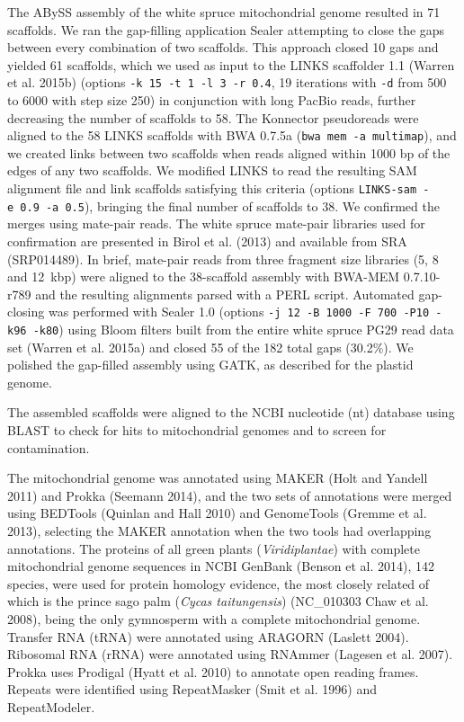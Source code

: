 \documentclass[
  12pt,
  oneside,
  openany]{book}
\begin{document}
The ABySS assembly of the white spruce mitochondrial genome resulted in 71 scaffolds. We ran the gap-filling application Sealer attempting to close the gaps between every combination of two scaffolds. This approach closed 10 gaps and yielded 61 scaffolds, which we used as input to the LINKS scaffolder 1.1 (Warren et al. 2015b) (options \texttt{-k\ 15\ -t\ 1\ -l\ 3\ -r\ 0.4}, 19 iterations with \texttt{-d} from 500 to 6000 with step size 250) in conjunction with long PacBio reads, further decreasing the number of scaffolds to 58. The Konnector pseudoreads were aligned to the 58 LINKS scaffolds with BWA 0.7.5a (\texttt{bwa\ mem\ -a\ multimap}), and we created links between two scaffolds when reads aligned within 1000 bp of the edges of any two scaffolds. We modified LINKS to read the resulting SAM alignment file and link scaffolds satisfying this criteria (options \texttt{LINKS-sam\ -e\ 0.9\ -a\ 0.5}), bringing the final number of scaffolds to 38. We confirmed the merges using mate-pair reads. The white spruce mate-pair libraries used for confirmation are presented in Birol et al. (2013) and available from SRA (SRP014489). In brief, mate-pair reads from three fragment size libraries (5, 8 and 12~kbp) were aligned to the 38-scaffold assembly with BWA-MEM 0.7.10-r789 and the resulting alignments parsed with a PERL script. Automated gap-closing was performed with Sealer 1.0 (options \texttt{-j\ 12\ -B\ 1000\ -F\ 700\ -P10\ -k96\ -k80}) using Bloom filters built from the entire white spruce PG29 read data set (Warren et al. 2015a) and closed 55 of the 182 total gaps (30.2\%). We polished the gap-filled assembly using GATK, as described for the plastid genome.

The assembled scaffolds were aligned to the NCBI nucleotide (nt) database using BLAST to check for hits to mitochondrial genomes and to screen for contamination.

The mitochondrial genome was annotated using MAKER (Holt and Yandell 2011) and Prokka (Seemann 2014), and the two sets of annotations were merged using BEDTools (Quinlan and Hall 2010) and GenomeTools (Gremme et al. 2013), selecting the MAKER annotation when the two tools had overlapping annotations. The proteins of all green plants (\emph{Viridiplantae}) with complete mitochondrial genome sequences in NCBI GenBank (Benson et al. 2014), 142 species, were used for protein homology evidence, the most closely related of which is the prince sago palm (\emph{Cycas taitungensis}) (NC\_010303 Chaw et al. 2008), being the only gymnosperm with a complete mitochondrial genome. Transfer RNA (tRNA) were annotated using ARAGORN (Laslett 2004). Ribosomal RNA (rRNA) were annotated using RNAmmer (Lagesen et al. 2007). Prokka uses Prodigal (Hyatt et al. 2010) to annotate open reading frames. Repeats were identified using RepeatMasker (Smit et al. 1996) and RepeatModeler.
\end{document}
